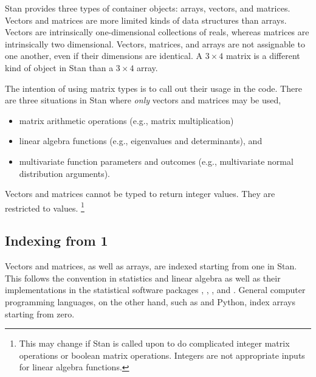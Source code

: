 Stan provides three types of container objects: arrays, vectors, and
matrices. Vectors and matrices are more limited kinds of data
structures than arrays.  Vectors are intrinsically one-dimensional
collections of reals, whereas matrices are intrinsically two
dimensional.  Vectors, matrices, and arrays are not assignable to one
another, even if their dimensions are identical.  A $3 \times 4$
matrix is a different kind of object in Stan than a $3 \times 4$
array.

The intention of using matrix types is to call out their usage in the
code.  There are three situations in Stan where {\it only} vectors and
matrices may be used,
%
\begin{itemize}
\item matrix arithmetic operations (e.g., matrix multiplication)
\item linear algebra functions (e.g., eigenvalues and determinants),
  and
\item multivariate function parameters and outcomes (e.g.,
  multivariate normal distribution arguments).
\end{itemize}
%

Vectors and matrices cannot be typed to return integer values.  They
are restricted to  values.%
%
\footnote{This may change if Stan is called upon to do complicated
  integer matrix operations or boolean matrix operations.  Integers
  are not appropriate inputs for linear algebra functions.}




\subsection{Indexing from 1}

Vectors and matrices, as well as arrays, are indexed starting from one
in Stan.  This follows the convention in statistics and linear
algebra as well as their implementations in the statistical software
packages \R, \MATLAB, \BUGS, and \JAGS.  General computer programming
languages, on the other hand, such as \Cpp and Python, index arrays
starting from zero.

